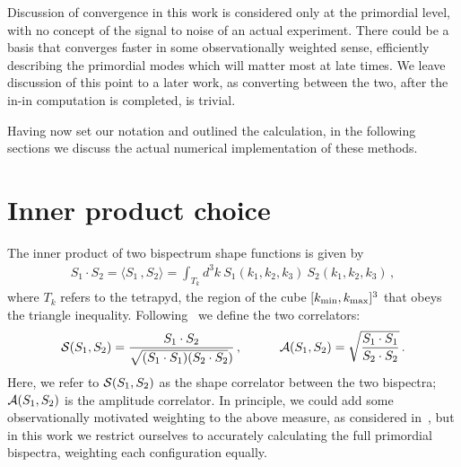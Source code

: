 Discussion of convergence in this work is considered only at the primordial level,
with no concept of the signal to noise of an actual experiment.
There could be a basis that converges faster in some observationally weighted sense,
efficiently describing the primordial modes which will matter most at late times.
We leave discussion of this point to a later work, as converting between the two,
after the in-in computation is completed, is trivial.


Having now set our notation and outlined the calculation, in the following sections we
discuss the actual numerical implementation of these methods.
\section{Inner product choice}\label{sec:inner_product}
The inner product of two bispectrum shape functions is given by 
\begin{align}
    S_1\cdot S_2  = \langle S_1\,, S_2 \rangle = \int_{T_k} d^3k \: S_1(k_1,k_2,k_3) \: S_2(k_1,k_2,k_3)\,,\label{inner_prod}
\end{align}
where $T_k$ refers to the tetrapyd, the region of the cube $[{k_\text{min}},{k_\text{max}}]^3$ that obeys the triangle inequality.
Following~\cite{hung_1902}
we define the two correlators:
\begin{align}
    \mathcal{S}(S_1,S_2) = \frac{S_1\cdot S_2}{\sqrt{(S_1\cdot S_1)(S_2\cdot S_2})}\,, \qquad\quad 
\mathcal{A}(S_1,S_2) = \sqrt{\frac{S_1\cdot S_1}{S_2\cdot S_2}}\,.
\end{align}
Here, we refer to $\mathcal{S}(S_1,S_2)$ as the shape correlator between the two bispectra;
$\mathcal{A}(S_1,S_2)$ is the amplitude correlator.
In principle, we could add some observationally motivated weighting
to the above measure, as considered in~\cite{FergShell_1,FergShell_2,FergShell_3},
but in this work we restrict ourselves to accurately calculating the
full primordial bispectra, weighting each configuration equally.

